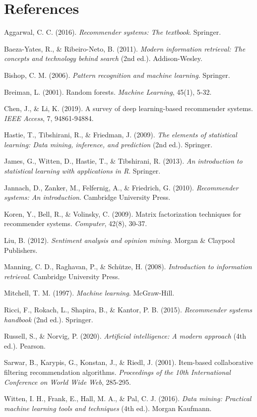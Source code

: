 \documentclass[12pt]{article}
\begin{document}
\section{References}

Aggarwal, C. C. (2016). \textit{Recommender systems: The textbook}. Springer.

Baeza-Yates, R., \& Ribeiro-Neto, B. (2011). \textit{Modern information retrieval: The concepts and technology behind search} (2nd ed.). Addison-Wesley.

Bishop, C. M. (2006). \textit{Pattern recognition and machine learning}. Springer.

Breiman, L. (2001). Random forests. \textit{Machine Learning}, 45(1), 5-32.

Chen, J., \& Li, K. (2019). A survey of deep learning-based recommender systems. \textit{IEEE Access}, 7, 94861-94884.

Hastie, T., Tibshirani, R., \& Friedman, J. (2009). \textit{The elements of statistical learning: Data mining, inference, and prediction} (2nd ed.). Springer.

James, G., Witten, D., Hastie, T., \& Tibshirani, R. (2013). \textit{An introduction to statistical learning with applications in R}. Springer.

Jannach, D., Zanker, M., Felfernig, A., \& Friedrich, G. (2010). \textit{Recommender systems: An introduction}. Cambridge University Press.

Koren, Y., Bell, R., \& Volinsky, C. (2009). Matrix factorization techniques for recommender systems. \textit{Computer}, 42(8), 30-37.

Liu, B. (2012). \textit{Sentiment analysis and opinion mining}. Morgan \& Claypool Publishers.

Manning, C. D., Raghavan, P., \& Schütze, H. (2008). \textit{Introduction to information retrieval}. Cambridge University Press.

Mitchell, T. M. (1997). \textit{Machine learning}. McGraw-Hill.

Ricci, F., Rokach, L., Shapira, B., \& Kantor, P. B. (2015). \textit{Recommender systems handbook} (2nd ed.). Springer.

Russell, S., \& Norvig, P. (2020). \textit{Artificial intelligence: A modern approach} (4th ed.). Pearson.

Sarwar, B., Karypis, G., Konstan, J., \& Riedl, J. (2001). Item-based collaborative filtering recommendation algorithms. \textit{Proceedings of the 10th International Conference on World Wide Web}, 285-295.

Witten, I. H., Frank, E., Hall, M. A., \& Pal, C. J. (2016). \textit{Data mining: Practical machine learning tools and techniques} (4th ed.). Morgan Kaufmann.
\end{document}
